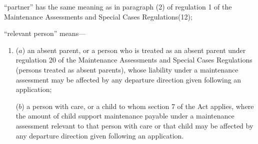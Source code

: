\documentclass[a4paper]{article}
\begin{document}
\begin{enumerate}
“partner” has the same meaning as in paragraph (2) of regulation 1 of the
Maintenance Assessments and Special Cases Regulations(12);

“relevant person” means—
\begin{enumerate}\item[]
($a$) an absent parent, or a person who is treated as an absent parent under
regulation 20 of the Maintenance Assessments and Special Cases Regulations
(persons treated as absent parents), whose liability under a maintenance
assessment may be affected by any departure direction given following an
application;

($b$) a person with care, or a child to whom section 7 of the Act applies, where
the amount of child support maintenance payable under a maintenance assessment
relevant to that person with care or that child may be affected by any departure
direction given following an application.
\end{enumerate}
\end{enumerate}
\end{document}
